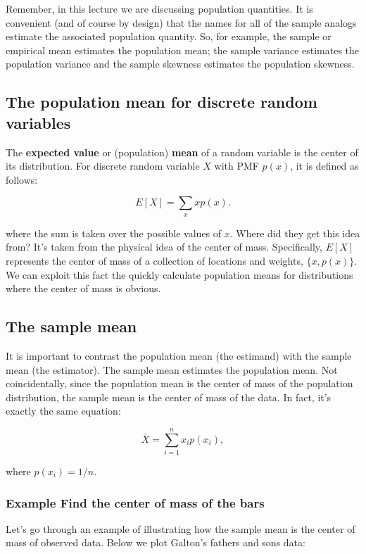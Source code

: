 \documentclass[]{article}
\begin{document}
Remember, in this lecture we are discussing population quantities. It is
convenient (and of course by design) that the names for all of the
sample analogs estimate the associated population quantity. So, for
example, the sample or empirical mean estimates the population mean; the
sample variance estimates the population variance and the sample
skewness estimates the population skewness.

\subsection{The population mean for discrete random
variables}\label{the-population-mean-for-discrete-random-variables}

The \textbf{expected value} or (population) \textbf{mean} of a random
variable is the center of its distribution. For discrete random variable
$X$ with PMF $p(x)$, it is defined as follows:

\[
E[X] = \sum_x xp(x).
\]

where the sum is taken over the possible values of $x$. Where did they
get this idea from? It's taken from the physical idea of the center of
mass. Specifically, $E[X]$ represents the center of mass of a collection
of locations and weights, $\{x, p(x)\}$. We can exploit this fact the
quickly calculate population means for distributions where the center of
mass is obvious.

\subsection{The sample mean}\label{the-sample-mean}

It is important to contrast the population mean (the estimand) with the
sample mean (the estimator). The sample mean estimates the population
mean. Not coincidentally, since the population mean is the center of
mass of the population distribution, the sample mean is the center of
mass of the data. In fact, it's exactly the same equation:

\[
\bar X = \sum_{i=1}^n x_i p(x_i),
\]

where $p(x_i) = 1/n$.

\subsubsection{Example Find the center of mass of the
bars}\label{example-find-the-center-of-mass-of-the-bars}

Let's go through an example of illustrating how the sample mean is the
center of mass of observed data. Below we plot Galton's fathers and sons
data:
\end{document}

